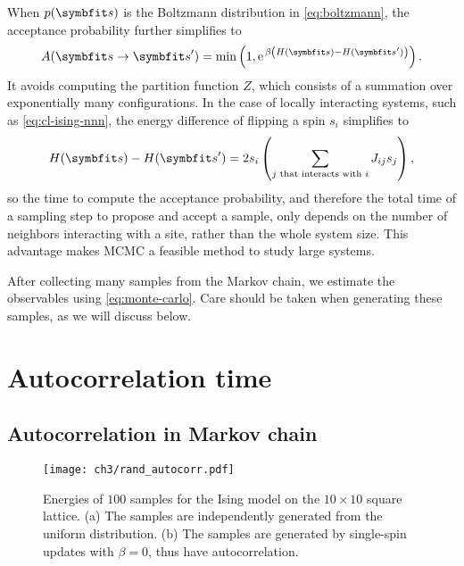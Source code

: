 When $p(\vs)$ is the Boltzmann distribution in \cref{eq:boltzmann}, the acceptance probability further simplifies to
\begin{equation}
A(\vs \to \vs') = \min\left( 1, \rme^{\,\beta \left( H(\vs) - H(\vs') \right)} \right).
\end{equation}
It avoids computing the partition function $Z$, which consists of a summation over exponentially many configurations. In the case of locally interacting systems, such as \cref{eq:cl-ising-nnn}, the energy difference of flipping a spin $s_i$ simplifies to
\begin{equation}
H(\vs) - H(\vs') = 2 s_i \left( \sum_{\text{$j$ that interacts with $i$}} J_{i j} s_j \right),
\end{equation}
so the time to compute the acceptance probability, and therefore the total time of a sampling step to propose and accept a sample, only depends on the number of neighbors interacting with a site, rather than the whole system size. This advantage makes MCMC a feasible method to study large systems.

After collecting many samples from the Markov chain, we estimate the observables using \cref{eq:monte-carlo}. Care should be taken when generating these samples, as we will discuss below.

\section{Autocorrelation time}
\label{sec:iat}

\subsection{Autocorrelation in Markov chain}

\begin{figure}[htb]
\centering
\texttt{[image: ch3/rand\_autocorr.pdf]}
\caption[Energy of Ising model from independent and autocorrelated samples]{
Energies of $100$ samples for the Ising model on the $10 \times 10$ square lattice.
(a) The samples are independently generated from the uniform distribution.
(b) The samples are generated by single-spin updates with $\beta = 0$, thus have autocorrelation.
}
\label{fig:rand-autocorr}
\end{figure}

